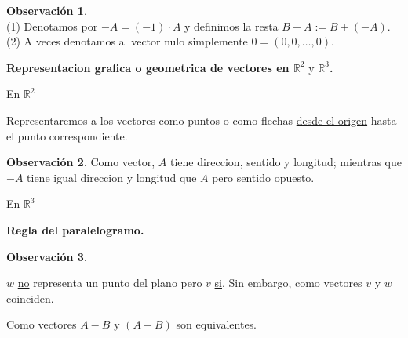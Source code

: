 \documentclass{article}
\theoremstyle{definition}
\theoremstyle{definition}
\newtheorem*{obs}{Observación}
\theoremstyle{remark}
\newcommand\R{\ensuremath{\mathbb{R}}}
\begin{document}
\begin{obs} \; \\
  (1) Denotamos por $-A=(-1)\cdot A$ y definimos la resta $B-A:=B+(-A)$. \\
  (2) A veces denotamos al vector nulo simplemente $0=(0,0, \dots, 0).$
\end{obs}

\begin{center}
  \textbf{Representacion grafica o geometrica de vectores en $\mathbb{R}^2 \text{ y } \mathbb{R}^3$.}
\end{center}
En $\R^2$
\begin{figure}[h]
\centering
\def\svgwidth{0.75\textwidth}

\end{figure}

Representaremos a los vectores como puntos o como flechas \underline{desde el origen} hasta el punto correspondiente. \begin{obs}
  Como vector, $A$ tiene direccion, sentido y longitud; mientras que $-A$ tiene igual direccion y longitud que $A$ pero sentido opuesto.
\end{obs}
\pagebreak
En $\R^3$
\begin{figure}[h]
\centering
\def\svgwidth{1\textwidth}

\end{figure}

\begin{center}
\textbf{Regla del paralelogramo.}
\end{center}

\begin{figure}[h]
\centering
\def\svgwidth{1\textwidth}

\end{figure}

\pagebreak
\begin{obs}
  \;
\end{obs}
$w$ \underline{no} representa un punto del plano pero $v$ \underline{si}. Sin embargo, como vectores $v$ y $w$ coinciden.

\begin{figure}[h]
\centering
\def\svgwidth{0.45\textwidth}

\end{figure}
Como vectores $A-B$ y $(A-B)$ son equivalentes.
\begin{figure}[h]
\centering
\def\svgwidth{0.75\textwidth}

\end{figure}
\end{document}
